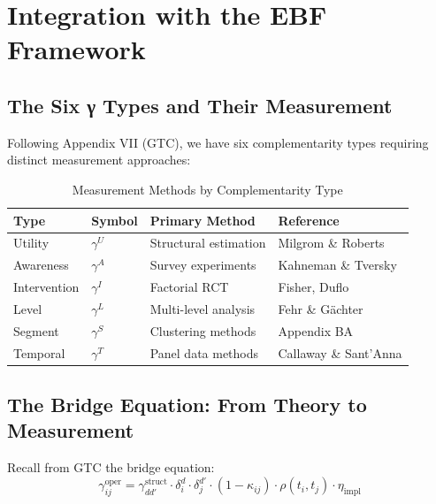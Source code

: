 \section{Integration with the EBF Framework}
\label{sec:ebf-integration}

\subsection{The Six γ Types and Their Measurement}
\label{subsec:six-gamma-measurement}

Following Appendix VII (GTC), we have six complementarity types requiring distinct measurement approaches:

\begin{table}[h]
\centering
\caption{Measurement Methods by Complementarity Type}
\label{tab:gamma-measurement}
\begin{tabular}{llll}
\hline
\textbf{Type} & \textbf{Symbol} & \textbf{Primary Method} & \textbf{Reference} \\
\hline
Utility & $\gamma^U$ & Structural estimation & Milgrom \& Roberts \\
Awareness & $\gamma^A$ & Survey experiments & Kahneman \& Tversky \\
Intervention & $\gamma^I$ & Factorial RCT & Fisher, Duflo \\
Level & $\gamma^L$ & Multi-level analysis & Fehr \& Gächter \\
Segment & $\gamma^S$ & Clustering methods & Appendix BA \\
Temporal & $\gamma^T$ & Panel data methods & Callaway \& Sant'Anna \\
\hline
\end{tabular}
\end{table}

\subsection{The Bridge Equation: From Theory to Measurement}
\label{subsec:bridge-measurement}

Recall from GTC the bridge equation:
\begin{equation}
\gamma^{\text{oper}}_{ij} = \gamma^{\text{struct}}_{dd'} \cdot \delta_i^d \cdot \delta_j^{d'} \cdot (1 - \kappa_{ij}) \cdot \rho(t_i, t_j) \cdot \eta_{\text{impl}}
\end{equation}

